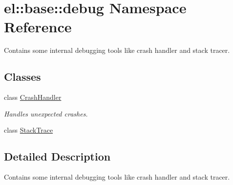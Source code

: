 \hypertarget{namespaceel_1_1base_1_1debug}{}\section{el\+:\+:base\+:\+:debug Namespace Reference}
\label{namespaceel_1_1base_1_1debug}


Contains some internal debugging tools like crash handler and stack tracer.  


\subsection*{Classes}
\begin{DoxyCompactItemize}
\item 
class \hyperlink{classel_1_1base_1_1debug_1_1_crash_handler}{Crash\+Handler}
\begin{DoxyCompactList}\small\item\em Handles unexpected crashes. \end{DoxyCompactList}\item 
class \hyperlink{classel_1_1base_1_1debug_1_1_stack_trace}{Stack\+Trace}
\end{DoxyCompactItemize}


\subsection{Detailed Description}
Contains some internal debugging tools like crash handler and stack tracer. 